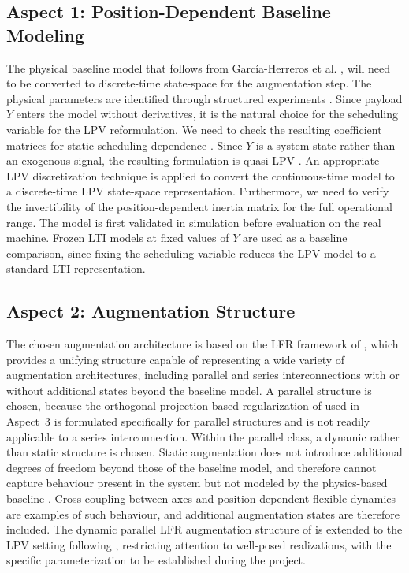 \subsection*{Aspect 1: Position-Dependent Baseline Modeling}
The physical baseline model that follows from Garc\'ia-Herreros et al. \cite{garcia2013model}, will need to be converted to discrete-time state-space for the augmentation step. The physical parameters are identified through structured experiments \cite{garcia2013model}. Since payload $Y$ enters the model without derivatives, it is the natural choice for the scheduling variable for the LPV reformulation. We need to check the resulting coefficient matrices for static scheduling dependence \cite{toth2010modeling}. Since $Y$ is a system state rather than an exogenous signal, the resulting formulation is quasi-LPV \cite{toth2010modeling}. An appropriate LPV discretization technique \cite{toth2010discretization} is applied to convert the continuous-time model to a discrete-time LPV state-space representation.
Furthermore, we need to verify the invertibility of the position-dependent inertia matrix for the full operational range. The model is first validated in simulation before evaluation on the real machine. Frozen LTI models at fixed values of $Y$ are used as a baseline comparison, since fixing the scheduling variable reduces the LPV model to a standard LTI representation.

\subsection*{Aspect 2: Augmentation Structure}
The chosen augmentation architecture is based on the LFR framework of \cite{hoekstra2026lfr}, which provides a unifying structure capable of representing a wide variety of augmentation architectures, including parallel and series interconnections with or without additional states beyond the baseline model.
A parallel structure is chosen, because the orthogonal projection-based regularization of \cite{gyorok2025l4dc} used in Aspect~3 is formulated specifically for parallel structures and is not readily applicable to a series interconnection.
Within the parallel class, a dynamic rather than static structure is chosen. Static augmentation does not introduce additional degrees of freedom beyond those of the baseline model, and therefore cannot capture behaviour present in the system but not modeled by the physics-based baseline \cite{hoekstra2026lfr}. Cross-coupling between axes and position-dependent flexible dynamics are examples of such behaviour, and additional augmentation states are therefore included.
The dynamic parallel LFR augmentation structure of \cite{hoekstra2026lfr} is extended to the LPV setting following \cite{drenth2025lpvlfr}, restricting attention to well-posed realizations, with the specific parameterization to be established during the project.

